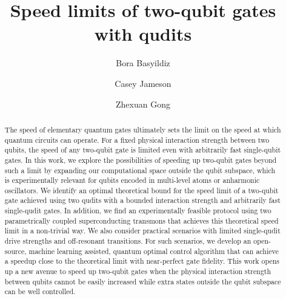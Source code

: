 \documentclass[twocolumn,english,pra,superscriptaddress]{revtex4-1}
\begin{document}
\title{Speed limits of two-qubit gates with qudits}

\author{Bora Basyildiz}

\author{Casey Jameson}



\author{Zhexuan Gong}

\begin{abstract}
The speed of elementary quantum gates ultimately sets the limit on the speed at which quantum circuits can operate. For a fixed physical interaction strength between two qubits, the speed of any two-qubit gate is limited even with arbitrarily fast single-qubit gates. In this work, we explore the possibilities of speeding up two-qubit gates beyond such a limit by expanding our computational space outside the qubit subspace, which is experimentally relevant for qubits encoded in multi-level atoms or anharmonic oscillators. We identify an optimal theoretical bound for the speed limit of a two-qubit gate achieved using two qudits with a bounded interaction strength and arbitrarily fast single-qudit gates. In addition, we find an experimentally feasible protocol using two parametrically coupled superconducting transmons that achieves this theoretical speed limit in a non-trivial way. We also consider practical scenarios with limited single-qudit drive strengths and off-resonant transitions. For such scenarios, we develop an open-source, machine learning assisted, quantum optimal control algorithm that can achieve a speedup close to the theoretical limit with near-perfect gate fidelity. This work opens up a new avenue to speed up two-qubit gates when the physical interaction strength between qubits cannot be easily increased while extra states outside the qubit subspace can be well controlled.
\end{abstract}
\end{document}
